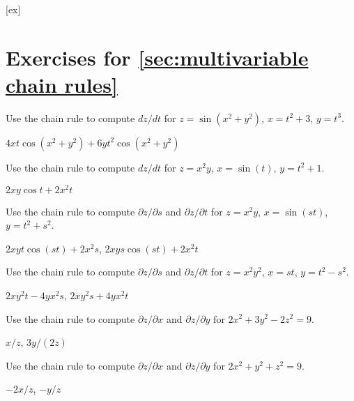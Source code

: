 [ex]
\section*{Exercises for \ref{sec:multivariable chain rules}}

\begin{enumialphparenastyle}

\begin{ex}
Use the chain rule to compute $dz/dt$ for
$z=\sin(x^2+y^2)$, $x=t^2+3$, $y=t^3$.
\begin{sol}
$4xt\cos(x^2+y^2)+6yt^2\cos(x^2+y^2)$
\end{sol}
\end{ex}

\begin{ex}
Use the chain rule to compute $dz/dt$ for
$z=x^2y$, $x=\sin(t)$, $y=t^2+1$.
\begin{sol}
$2xy\cos t+2x^2t$
\end{sol}
\end{ex}

\begin{ex}
Use the chain rule to compute $\partial z/\partial s$ and 
$\partial z/\partial t$ for
$z=x^2y$, $x=\sin(st)$, $y=t^2+s^2$.
\begin{sol}
$2xyt\cos(st)+2x^2s$, $2xys\cos(st)+2x^2t$
\end{sol}
\end{ex}

\begin{ex}
Use the chain rule to compute $\partial z/\partial s$ and 
$\partial z/\partial t$ for
$z=x^2y^2$, $x=st$, $y=t^2-s^2$.
\begin{sol}
$2xy^2t-4yx^2s$, $2xy^2s+4yx^2t$
\end{sol}
\end{ex}

\begin{ex}
Use the chain rule to compute $\partial z/\partial x$ and 
$\partial z/\partial y$ for $2x^2+3y^2-2z^2=9$.
\begin{sol}
$x/z$, $3y/(2z)$
\end{sol}
\end{ex}

\begin{ex}
Use the chain rule to compute $\partial z/\partial x$ and 
$\partial z/\partial y$ for $2x^2+y^2+z^2=9$.
\begin{sol}
$-2x/z$, $-y/z$
\end{sol}
\end{ex}


\end{enumialphparenastyle}
